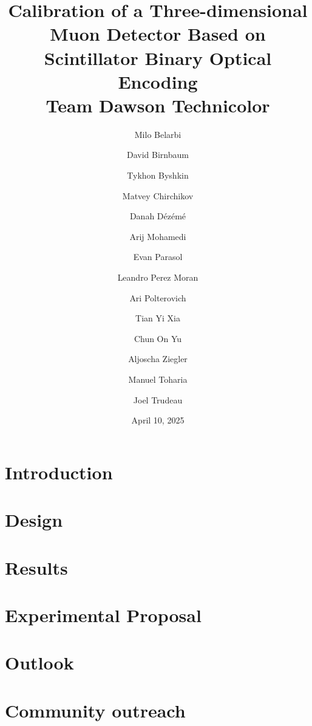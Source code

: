 \documentclass[aps,prl,reprint,groupedaddress]{revtex4-1}
\begin{document}
\title{Calibration of a Three-dimensional Muon Detector Based on Scintillator Binary Optical Encoding\\[0.5ex] \small Team Dawson Technicolor}

\author{Milo Belarbi}
\author{David Birnbaum}
\author{Tykhon Byshkin}
\author{Matvey Chirchikov}
\author{Danah Dézémé}
\author{Arij Mohamedi} 
\author{Evan Parasol}
\author{Leandro Perez Moran}
\author{Ari Polterovich}
\author{Tian Yi Xia}
\author{Chun On Yu}
\author{Aljoscha Ziegler}
\author{Manuel Toharia}
\author{Joel Trudeau}

\date{April 10, 2025}

\maketitle




\section{Introduction}


\section{Design}



\vspace{40mm}
\section{Results}



\section{Experimental Proposal}


\section{Outlook}


\section{Community outreach}

\end{document}
